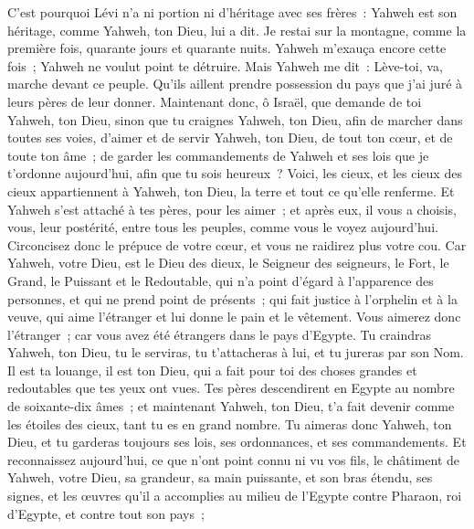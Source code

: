 \begin{multicols}{2}
C'est pourquoi Lévi n'a ni portion ni d'héritage avec ses frères~: Yahweh est son héritage, comme Yahweh, ton Dieu, lui a dit.
Je restai sur la montagne, comme la première fois, quarante jours et quarante nuits. Yahweh m'exauça encore cette fois~; Yahweh ne voulut point te détruire.
Mais Yahweh me dit~: Lève-toi, va, marche devant ce peuple. Qu'ils aillent prendre possession du pays que j'ai juré à leurs pères de leur donner.
Maintenant donc, ô Israël, que demande de toi Yahweh, ton Dieu, sinon que tu craignes Yahweh, ton Dieu, afin de marcher dans toutes ses voies, d'aimer et de servir Yahweh, ton Dieu, de tout ton cœur, et de toute ton âme~;
de garder les commandements de Yahweh et ses lois que je t'ordonne aujourd'hui, afin que tu sois heureux~?
Voici, les cieux, et les cieux des cieux appartiennent à Yahweh, ton Dieu, la terre et tout ce qu'elle renferme.
Et Yahweh s'est attaché à tes pères, pour les aimer~; et après eux, il vous a choisis, vous, leur postérité, entre tous les peuples, comme vous le voyez aujourd'hui.
Circoncisez donc le prépuce de votre cœur, et vous ne raidirez plus votre cou.
Car Yahweh, votre Dieu, est le Dieu des dieux, le Seigneur des seigneurs, le Fort, le Grand, le Puissant et le Redoutable, qui n'a point d'égard à l'apparence des personnes, et qui ne prend point de présents~;
qui fait justice à l'orphelin et à la veuve, qui aime l'étranger et lui donne le pain et le vêtement.
Vous aimerez donc l'étranger~; car vous avez été étrangers dans le pays d'Egypte.
Tu craindras Yahweh, ton Dieu, tu le serviras, tu t'attacheras à lui, et tu jureras par son Nom.
Il est ta louange, il est ton Dieu, qui a fait pour toi des choses grandes et redoutables que tes yeux ont vues.
Tes pères descendirent en Egypte au nombre de soixante-dix âmes~; et maintenant Yahweh, ton Dieu, t'a fait devenir comme les étoiles des cieux, tant tu es en grand nombre.
\VerseOne{}Tu aimeras donc Yahweh, ton Dieu, et tu garderas toujours ses lois, ses ordonnances, et ses commandements.
Et reconnaissez aujourd'hui, ce que n'ont point connu ni vu vos fils, le châtiment de Yahweh, votre Dieu, sa grandeur, sa main puissante, et son bras étendu,
ses signes, et les œuvres qu'il a accomplies au milieu de l'Egypte contre Pharaon, roi d'Egypte, et contre tout son pays~;

\end{multicols}
